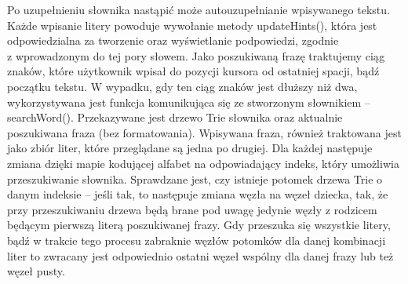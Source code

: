 \documentclass[twoside,a4paper]{book}
\begin{document}
Po uzupełnieniu słownika nastąpić może autouzupełnianie wpisywanego tekstu.
Każde wpisanie litery powoduje wywołanie metody updateHints(), która jest odpowiedzialna za tworzenie oraz wyświetlanie podpowiedzi, zgodnie \\z wprowadzonym do tej pory słowem. Jako poszukiwaną frazę traktujemy ciąg znaków, które użytkownik wpisał do pozycji kursora od ostatniej spacji, bądź początku tekstu. W wypadku, gdy ten ciąg znaków jest dłuższy niż dwa, wykorzystywana jest funkcja komunikująca się ze stworzonym słownikiem – searchWord(). Przekazywane jest drzewo Trie słownika oraz aktualnie poszukiwana fraza (bez formatowania). 
Wpisywana fraza, również traktowana jest jako zbiór liter, które przeglądane są jedna po drugiej. Dla każdej następuje zmiana dzięki mapie kodującej alfabet na odpowiadający indeks, który umożliwia przeszukiwanie słownika. Sprawdzane jest, czy istnieje potomek drzewa Trie o danym indeksie – jeśli tak, to następuje zmiana węzła na węzeł dziecka, tak, że przy przeszukiwaniu drzewa będą brane pod uwagę jedynie węzły z rodzicem będącym pierwszą literą poszukiwanej frazy. Gdy przeszuka się wszystkie litery, bądź w trakcie tego procesu zabraknie węzłów potomków dla danej kombinacji liter to zwracany jest odpowiednio ostatni węzeł wspólny dla danej frazy lub też węzeł pusty. 
\end{document}
